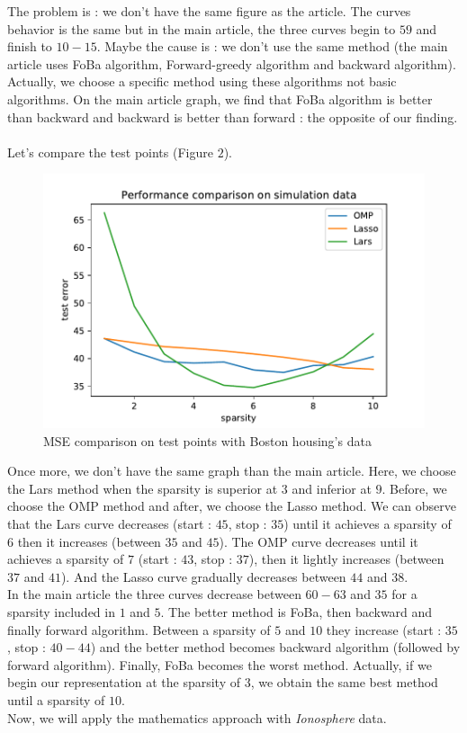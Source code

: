 \documentclass{article}
\begin{document}
The problem is : we don't have the same figure as the article. The curves behavior is the same but in the main article, the three curves begin to $59$ and finish to $10-15$. Maybe the cause is : we don't use the same method (the main article uses FoBa algorithm, Forward-greedy algorithm and backward algorithm). Actually, we choose a specific method using these algorithms not basic algorithms. On the main article graph, we find that FoBa algorithm is better than backward and backward is better than forward : the opposite of our finding.\\
\\
Let's compare the test points (Figure $2$).\\
\begin{figure}[!ht]
    \centering
    \includegraphics[scale=0.5]{./images/test_error_housing.pdf}
    \caption{MSE comparison on test points with Boston housing's data}
    \label{Figure 2}
\end{figure}
Once more, we don't have the same graph than the main article. Here, we choose the Lars method when the sparsity is superior at $3$ and inferior at $9$. Before, we choose the OMP method and after, we choose the Lasso method. We can observe that the Lars curve decreases (start : $45$, stop : $35$) until it achieves a sparsity of $6$ then it increases (between $35$ and $45$). The OMP curve decreases until it achieves a sparsity of $7$ (start : $43$, stop : $37$), then it lightly increases (between $37$ and $41$). And the Lasso curve gradually decreases between $44$ and $38$.\\
In the main article the three curves decrease between $60-63$ and $35$ for a sparsity included in $1$ and $5$. The better method is FoBa, then backward and finally forward algorithm. Between a sparsity of $5$ and $10$ they increase (start : $35$, stop : $40-44$) and the better method becomes backward algorithm (followed by forward algorithm). Finally, FoBa becomes the worst method. Actually, if we begin our representation at the sparsity of $3$, we obtain the same best method until a sparsity of $10$.
\\
Now, we will apply the mathematics approach with \textit{Ionosphere} data.
\end{document}
